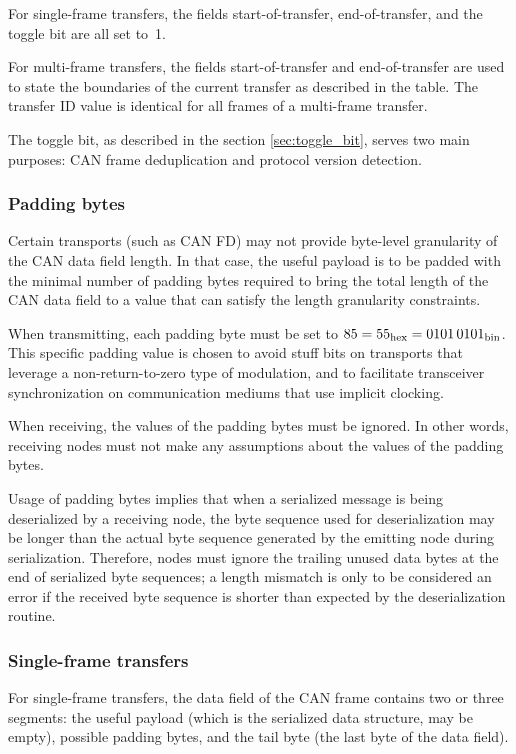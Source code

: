 For single-frame transfers, the fields start-of-transfer, end-of-transfer, and the toggle bit
are all set to~1.

For multi-frame transfers, the fields start-of-transfer and end-of-transfer
are used to state the boundaries of the current transfer as described in the table.
The transfer ID value is identical for all frames of a multi-frame transfer.

The toggle bit, as described in the section \ref{sec:toggle_bit}, serves
two main purposes: CAN frame deduplication and protocol version detection.

\subsubsection{Padding bytes}

Certain transports (such as CAN FD) may not provide byte-level granularity of the CAN data field length.
In that case, the useful payload is to be padded with the minimal number of padding bytes required
to bring the total length of the CAN data field to a value that can satisfy the length granularity constraints.

When transmitting, each padding byte must be set to $\text{85} = \text{55}_\text{hex} = \text{0101\,0101}_\text{bin}$.
This specific padding value is chosen to avoid stuff bits on transports that leverage a non-return-to-zero
type of modulation, and to facilitate transceiver synchronization on communication mediums that use implicit clocking.

When receiving, the values of the padding bytes must be ignored.
In other words, receiving nodes must not make any assumptions about the values of the
padding bytes.

Usage of padding bytes implies that when a serialized message is being deserialized by a receiving node,
the byte sequence used for deserialization may be longer than the actual byte sequence generated by the
emitting node during serialization.
Therefore, nodes must ignore the trailing unused data bytes at the end of serialized byte sequences;
a length mismatch is only to be considered an error if the received byte sequence is shorter
than expected by the deserialization routine.

\subsubsection{Single-frame transfers}

For single-frame transfers, the data field of the CAN frame contains two or three segments:
the useful payload (which is the serialized data structure, may be empty), possible padding bytes,
and the tail byte (the last byte of the data field).

